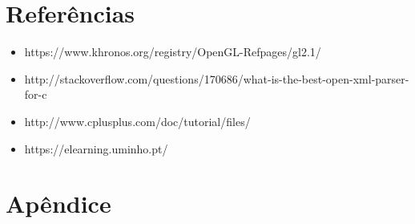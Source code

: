 \documentclass{report}
\begin{document}
\chapter{Refer\^encias}

\begin{itemize}\newline

\item https://www.khronos.org/registry/OpenGL-Refpages/gl2.1/
\item http://stackoverflow.com/questions/170686/what-is-the-best-open-xml-parser-
for-c
\item http://www.cplusplus.com/doc/tutorial/files/
\item https://elearning.uminho.pt/


\end{itemize}
\appendix
\chapter{Ap\^endice}
\end{document}
